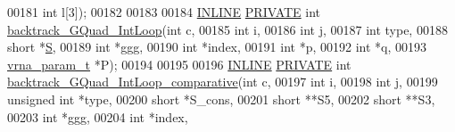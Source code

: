 \begin{DoxyCode}
00181                 \textcolor{keywordtype}{int}         l[3]);
00182 
00183 
00184 \mbox{\hyperlink{gquad_8h_a2eb6f9e0395b47b8d5e3eeae4fe0c116}{INLINE}} \mbox{\hyperlink{edit__cost_8h_a5e151c615eda34903514212f05a5ccf8}{PRIVATE}} \textcolor{keywordtype}{int} \mbox{\hyperlink{group__gquads_ga220c41e8dbcee940ac975b8ce88e55c5}{backtrack\_GQuad\_IntLoop}}(\textcolor{keywordtype}{int}          c,
00185                                            \textcolor{keywordtype}{int}          i,
00186                                            \textcolor{keywordtype}{int}          j,
00187                                            \textcolor{keywordtype}{int}          type,
00188                                            \textcolor{keywordtype}{short}        *\mbox{\hyperlink{group__energy__parameters__rw_gga7bf2bb363bcf5ce50d60255d256e5682af1ce01387d2348f8b858721a7db81670}{S}},
00189                                            \textcolor{keywordtype}{int}          *ggg,
00190                                            \textcolor{keywordtype}{int}          *index,
00191                                            \textcolor{keywordtype}{int}          *p,
00192                                            \textcolor{keywordtype}{int}          *q,
00193                                            \mbox{\hyperlink{group__energy__parameters_structvrna__param__s}{vrna\_param\_t}} *P);
00194 
00195 
00196 \mbox{\hyperlink{gquad_8h_a2eb6f9e0395b47b8d5e3eeae4fe0c116}{INLINE}} \mbox{\hyperlink{edit__cost_8h_a5e151c615eda34903514212f05a5ccf8}{PRIVATE}} \textcolor{keywordtype}{int} \mbox{\hyperlink{group__gquads_ga6665a4196ea41a8d08c3c309c1262384}{backtrack\_GQuad\_IntLoop\_comparative}}(\textcolor{keywordtype}{int} 
               c,
00197                                                        \textcolor{keywordtype}{int}          i,
00198                                                        \textcolor{keywordtype}{int}          j,
00199                                                        \textcolor{keywordtype}{unsigned} \textcolor{keywordtype}{int} *type,
00200                                                        \textcolor{keywordtype}{short}        *S\_cons,
00201                                                        \textcolor{keywordtype}{short}        **S5,
00202                                                        \textcolor{keywordtype}{short}        **S3,
00203                                                        \textcolor{keywordtype}{int}          *ggg,
00204                                                        \textcolor{keywordtype}{int}          *index,

\end{DoxyCode}
